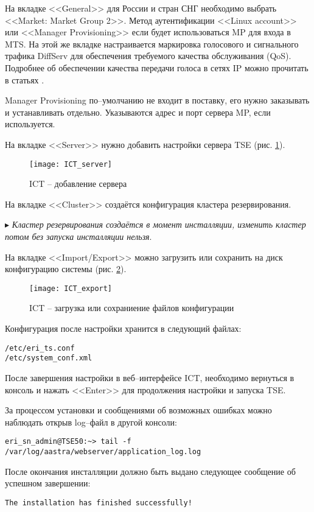 На вкладке <<General>> для России и стран СНГ необходимо выбрать <<Market: Market Group 2>>. Метод аутентификации <<Linux account>> или <<Manager Provisioning>> если будет использоваться MP для входа в MTS. На этой же вкладке настраивается маркировка голосового и сигнального трафика DiffServ для обеспечения требуемого качества обслуживания (QoS). Подробнее об обеспечении качества передачи голоса в сетях IP можно прочитать в статьях \cite{yanovsky1, yanovsky2}.

Manager Provisioning по--умолчанию не входит в поставку, его нужно заказывать и устанавливать отдельно. Указываются адрес и порт сервера MP, если используется.

На вкладке <<Server>> нужно добавить настройки сервера TSE (рис. \ref{img:ICT_server}).
\begin{figure}[!ht]
  \center
  \texttt{[image: ICT\_server]}
  \caption{ICT -- добавление сервера}
  \label{img:ICT_server}
\end{figure}

На вкладке <<Cluster>> создаётся конфигурация кластера резервирования.
\par $\blacktriangleright$ {\em Кластер резервирования создаётся в момент инсталляции, изменить кластер потом без запуска инсталляции нельзя}.

На вкладке <<Import/Export>> можно загрузить или сохранить на диск конфигурацию системы (рис. \ref{img:ICT_export}).
\begin{figure}[!ht]
  \center
  \texttt{[image: ICT\_export]}
  \caption{ICT -- загрузка или сохраниение файлов конфигурации}
  \label{img:ICT_export}
\end{figure}

Конфигурация после настройки хранится в следующий файлах: 
\begin{lstlisting}
/etc/eri_ts.conf
/etc/system_conf.xml
\end{lstlisting}

После завершения настройки в веб--интерфейсе ICT, необходимо вернуться в консоль и нажать <<Enter>> для продолжения настройки и запуска TSE.

За процессом установки и сообщениями об возможных ошибках можно наблюдать открыв log--файл в другой консоли:
\begin{lstlisting}
eri_sn_admin@TSE50:~> tail -f /var/log/aastra/webserver/application_log.log
\end{lstlisting}

После окончания инсталляции должно быть выдано следующее сообщение об успешном завершении:
\begin{lstlisting}
The installation has finished successfully!
\end{lstlisting}

